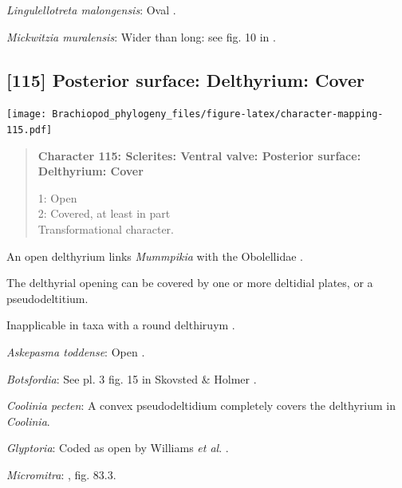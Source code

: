 \documentclass[openany]{book}
\begin{document}
\hypertarget{Lingulellotreta_malongensis-coding-114}{}
\emph{Lingulellotreta malongensis}: Oval
\citep{Williams2000LinguliformeaCraniiformea}.

\hypertarget{Mickwitzia_muralensis-coding-114}{}
\emph{Mickwitzia muralensis}: Wider than long: see fig. 10 in
\citet{Balthasar2004Shellstructure}.

\subsection*{{[}115{]} Posterior surface: Delthyrium:
Cover}\label{posterior-surface-delthyrium-cover}

\texttt{[image: Brachiopod\_phylogeny\_files/figure-latex/character-mapping-115.pdf]}

\begin{quote}
\textbf{Character 115: Sclerites: Ventral valve: Posterior surface:
Delthyrium: Cover}

1: Open\\
2: Covered, at least in part\\
Transformational character.
\end{quote}

An open delthyrium links \emph{Mummpikia} with the Obolellidae
\citep{Balthasar2008iMummpikia}.

The delthyrial opening can be covered by one or more deltidial plates,
or a pseudodeltitium.

Inapplicable in taxa with a round delthiruym \citep[generated by
overgrowth of the delthyrial opening by posterolateral parts of the
shell, per][]{Popov1992TheCambrian}.

\hypertarget{Askepasma_toddense-coding-115}{}
\emph{Askepasma toddense}: Open \citep{Topper2013Theoldest}.

\hypertarget{Botsfordia-coding-115}{}
\emph{Botsfordia}: See pl. 3 fig. 15 in Skovsted \& Holmer
\citeyearpar{Skovsted2005EarlyCambrian}.

\hypertarget{Coolinia_pecten-coding-115}{}
\emph{Coolinia pecten}: A convex pseudodeltidium completely covers the
delthyrium in \emph{Coolinia}.

\hypertarget{Glyptoria-coding-115}{}
\emph{Glyptoria}: Coded as open by Williams \emph{et al}.
\citeyearpar{Williams1998Thediversity}.

\hypertarget{Micromitra-coding-115}{}
\emph{Micromitra}: \citet{Williams2000LinguliformeaCraniiformea}, fig.
83.3.
\end{document}
